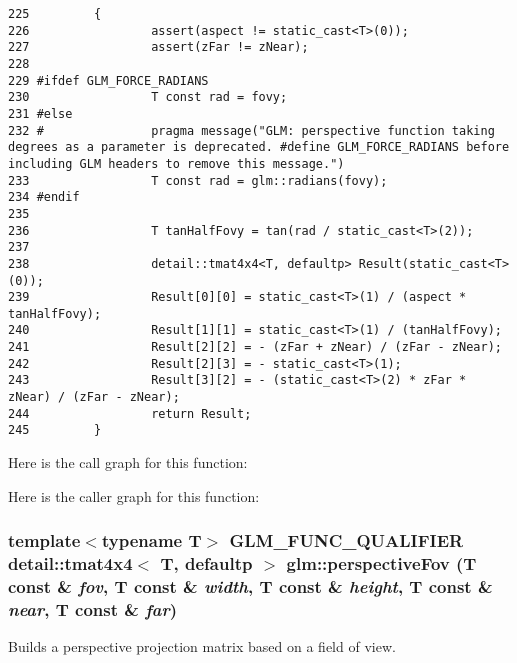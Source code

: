 \begin{Code}\begin{verbatim}225         {
226                 assert(aspect != static_cast<T>(0));
227                 assert(zFar != zNear);
228 
229 #ifdef GLM_FORCE_RADIANS
230                 T const rad = fovy;
231 #else
232 #               pragma message("GLM: perspective function taking degrees as a parameter is deprecated. #define GLM_FORCE_RADIANS before including GLM headers to remove this message.")
233                 T const rad = glm::radians(fovy);
234 #endif
235 
236                 T tanHalfFovy = tan(rad / static_cast<T>(2));
237 
238                 detail::tmat4x4<T, defaultp> Result(static_cast<T>(0));
239                 Result[0][0] = static_cast<T>(1) / (aspect * tanHalfFovy);
240                 Result[1][1] = static_cast<T>(1) / (tanHalfFovy);
241                 Result[2][2] = - (zFar + zNear) / (zFar - zNear);
242                 Result[2][3] = - static_cast<T>(1);
243                 Result[3][2] = - (static_cast<T>(2) * zFar * zNear) / (zFar - zNear);
244                 return Result;
245         }
\end{verbatim}
\end{Code}




Here is the call graph for this function:

Here is the caller graph for this function:\hypertarget{group__gtc__matrix__transform_gc9db4ea8ecdcb00f1d06d29603b5df52}{
\subsubsection[perspectiveFov]{\setlength{\rightskip}{0pt plus 5cm}template$<$typename T$>$ GLM\_\-FUNC\_\-QUALIFIER detail::tmat4x4$<$ T, defaultp $>$ glm::perspectiveFov (T const \& {\em fov}, \/  T const \& {\em width}, \/  T const \& {\em height}, \/  T const \& {\em near}, \/  T const \& {\em far})}}
\label{group__gtc__matrix__transform_gc9db4ea8ecdcb00f1d06d29603b5df52}


Builds a perspective projection matrix based on a field of view.

